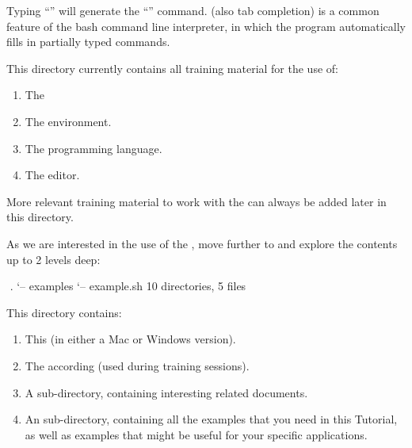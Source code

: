 Typing ``'' will generate the
``'' command. (also tab completion) is a common feature of the bash command line
interpreter, in which the program automatically fills in partially typed
commands.


This directory currently contains all training material for the use of:

\begin{enumerate}
\item  The 
\item  The  environment.
\item  The  programming language.
\item  The  editor.
\end{enumerate}

More relevant training material to work with the \hpc can always be added
later in this directory.

As we are interested in the use of the , move
further to  and explore the contents up to 2 levels
deep:

\begin{prompt}
$ %
$ %
.
`-- examples
    `-- example.sh
10 directories, 5 files
\end{prompt}

This directory contains:

\begin{enumerate}
  \item This  (in either a Mac or Windows
    version).
  \item The according  (used during training
    sessions).
  \item A  sub-directory, containing interesting \hpc
    related documents.
  \item An  sub-directory, containing all the
    examples that you need in this Tutorial, as well as examples that might be
    useful for your specific applications.
\end{enumerate}

